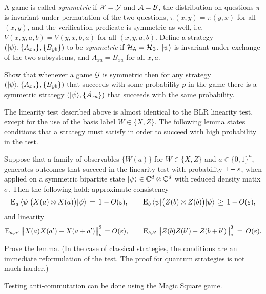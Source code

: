 \begin{exercise}
A game is called \emph{symmetric} if $\mathcal{X}=\mathcal{Y}$ and $\mathcal{A}=\mathcal{B}$, the distribution on questions $\pi$ is invariant under permutation of the two questions, $\pi(x,y)=\pi(y,x)$ for all $(x,y)$, and the verification predicate is symmetric as well, i.e.\ $V(x,y,a,b)=V(y,x,b,a)$ for all $(x,y,a,b)$. Define a strategy $(|\psi\rangle,\{A_{xa}\},\{B_{yb}\})$ to be \emph{symmetric} if $\mathcal{H}_{\textsf{A}}=\mathcal{H}_{\textsf{B}}$, $|\psi\rangle$ is invariant under exchange of the two subsystems, and $A_{xa} = B_{xa}$ for all $x,a$. 

Show that whenever a game $\mathcal{G}$ is symmetric then for any strategy $(|\psi\rangle,\{A_{xa}\},\{B_{yb}\})$ that succeeds with some probability $p$ in the game there is a symmetric strategy $(|\tilde{\psi}\rangle,\{\tilde{A}_{xa}\})$ that succeeds with the same probability. 
\end{exercise}

The linearity test described above is almost identical to the BLR linearity test, except for the use of the basis label $W\in\{X,Z\}$. The following lemma states conditions that a strategy must satisfy in order to succeed with high probability in the test. 
 
\begin{lemma}\label{lem:com}
Suppose that a family of observables $\{W(a)\}$ for $W\in\{X,Z\}$ and $a\in\{0,1\}^n$, generates outcomes that succeed in the linearity test with probability $1-\varepsilon$, when applied on a symmetric bipartite state $|\psi\rangle\in\mathbb{C}^d\otimes \mathbb{C}^d$ with reduced density matix $\sigma$. Then the following hold: approximate consistency
$$ \textsc{E}_{a} \, \langle\psi|\big(X(a) \otimes X(a)\big) |\psi\rangle \,=\,1-O(\varepsilon),\qquad \textsc{E}_{b} \, \langle\psi|\big(Z(b) \otimes Z(b) \big)|\psi\rangle\,\geq\,1-O(\varepsilon),$$ 
and linearity 
$$
 \textsc{E}_{a,a'} \,\big\|X(a)X(a')-X(a+a')\big\|_\sigma^2 = O(\varepsilon),\qquad\textsc{E}_{b,b'}\, \big\|Z(b)Z(b')-Z(b+b')\big\|_\sigma^2  \,=\, O({\varepsilon}).$$
\end{lemma}

\begin{exercise}
Prove the lemma. (In the case of classical strategies, the conditions are an immediate reformulation of the test. The proof for quantum strategies is not much harder.)
\end{exercise}

Testing anti-commutation can be done using the Magic Square game. 

